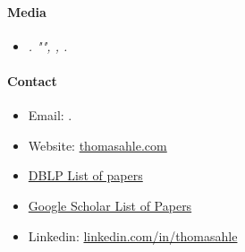 \documentclass[11pt]{article}
\begin{document}
\paragraph{Media}
\begin{itemize}
   \item[]
      \emph{.
         "", , .}
\end{itemize}

\paragraph{Contact}
\begin{itemize}
   \item[]
      Email: .
   \item[]
      Website: \href{http://www.thomasahle.com}{thomasahle.com}
   \item[]
      \href{https://dblp1.uni-trier.de/pers/hd/a/Ahle:Thomas_D=}{DBLP List of papers}
   \item[]
      \href{https://scholar.google.dk/citations?user=aRiVoYgAAAAJ}{Google Scholar List of Papers}
   \item[]
      Linkedin: \href{https://www.linkedin.com/in/thomasahle/}{linkedin.com/in/thomasahle}
\end{itemize}
\end{document}
